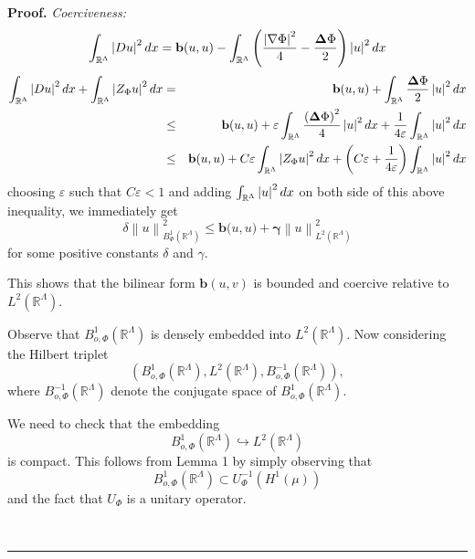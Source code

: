\documentclass{article}
\newenvironment{proof}[1][Proof]{\noindent\textbf{#1.} }{\ \rule{0.5em}{0.5em}}
\begin{document}
\begin{proof}
\textit{Coerciveness:}%
\begin{equation*}
\int_{\mathbb{R}^{\Lambda }}\left| Du\right| ^{2}dx=\mathbf{b}(u,u)-\int_{%
\mathbb{R}^{\Lambda }}\left( \dfrac{\left| \mathbf{\nabla }\Phi \right| ^{2}%
}{4}-\dfrac{\mathbf{\Delta }\Phi }{2}\right) \left| u\right| ^{2}dx
\end{equation*}%
\begin{eqnarray*}
\int_{\mathbb{R}^{\Lambda }}\left| Du\right| ^{2}dx+\int_{\mathbb{R}%
^{\Lambda }}\left| Z_{\Phi }u\right| ^{2}dx &=&\mathbf{b}(u,u)+\int_{\mathbb{%
R}^{\Lambda }}\dfrac{\mathbf{\Delta }\Phi }{2}\left| u\right| ^{2}dx \\
&\leq &\mathbf{b}(u,u)+\varepsilon \int_{\mathbb{R}^{\Lambda }}\dfrac{\left( 
\mathbf{\Delta }\Phi \right) ^{2}}{4}\left| u\right| ^{2}dx+\frac{1}{%
4\varepsilon }\int_{\mathbb{R}^{\Lambda }}\left| u\right| ^{2}dx \\
&\leq &\mathbf{b}(u,u)+C\varepsilon \int_{\mathbb{R}^{\Lambda }}\left|
Z_{\Phi }u\right| ^{2}dx+\left( C\varepsilon +\frac{1}{4\varepsilon }\right)
\int_{\mathbb{R}^{\Lambda }}\left| u\right| ^{2}dx
\end{eqnarray*}%
choosing $\varepsilon $ such that $C\varepsilon <1$ and adding $\int_{%
\mathbb{R}^{\Lambda }}\left| u\right| ^{2}dx$ on both side of this above
inequality, we immediately get 
\begin{equation}
\delta \left\| u\right\| _{B_{\Phi }^{1}(\mathbb{R}^{\Lambda })}^{2}\leq 
\mathbf{b(}u,u\mathbf{)+\gamma }\left\| u\right\| _{L^{2}(\mathbb{R}%
^{\Lambda })}^{2}
\end{equation}%
for some positive constants $\delta $ and $\gamma .$

This shows that the bilinear form $\mathbf{b}(u,v)$ is bounded and coercive
relative to $L^{2}(\mathbb{R}^{\Lambda }).$

Observe that $B_{o,\Phi }^{1}(\mathbb{R}^{\Lambda })$ is densely embedded
into $L^{2}(\mathbb{R}^{\Lambda }).$ Now considering the Hilbert triplet 
\begin{equation}
\left( B_{o,\Phi }^{1}(\mathbb{R}^{\Lambda }),L^{2}(\mathbb{R}^{\Lambda
}),B_{o,\Phi }^{-1}(\mathbb{R}^{\Lambda })\right) ,
\end{equation}%
where $B_{o,\Phi }^{-1}(\mathbb{R}^{\Lambda })$ denote the conjugate space
of $B_{o,\Phi }^{1}(\mathbb{R}^{\Lambda }).$

We need to check that the embedding 
\begin{equation*}
B_{o,\Phi }^{1}(\mathbb{R}^{\Lambda })\hookrightarrow L^{2}(\mathbb{R}%
^{\Lambda })
\end{equation*}%
is compact. This follows from Lemma 1 by simply observing that 
\begin{equation*}
B_{o,\Phi }^{1}(\mathbb{R}^{\Lambda })\subset U_{\Phi }^{-1}\left( H^{1}(\mu
)\right)
\end{equation*}%
and the fact that $U_{\Phi }$ is a unitary operator.


\end{proof}
\end{document}
